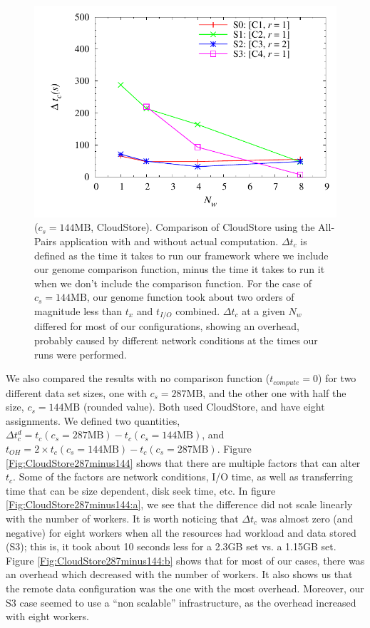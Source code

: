 \documentclass{rspublic}
\begin{document}
\begin{figure}
\begin{center}
\includegraphics[scale=0.5]{data/graphs/CloudStoreComputeMinusNoCompute144}
\caption{($c_s= \mbox{144MB}$, CloudStore). Comparison of CloudStore using the All-Pairs application with
and without actual computation. $\Delta t_c$ is defined as the time it
takes to run our framework where we include our genome comparison
function, minus the time it takes to run it when we don't include the
comparison function. For the case of $c_s=144\mbox{MB}$, our genome function
took about two orders of magnitude less than $t_x$ and $t_{I/O}$
combined. $\Delta t_c$ at a given $N_w$ differed for most of our
configurations, showing an overhead, probably caused by different
network conditions at the times our runs were performed.}
\label{Fig:experiment4}
\end{center}
\vspace{-0.5cm}
\end{figure}

We also compared the results with no comparison function
($t_{compute}=0$) for two different data set sizes, one with $c_s =
287\mbox{MB}$, and the other one with half the size, $c_s = 144\mbox{MB}$ (rounded
value). Both used CloudStore, and have eight assignments. We defined two
quantities, $\Delta t_c^d = t_c(c_s = 287\mbox{MB}) - t_c(c_s = 144\mbox{MB})$, and
$t_{OH} = 2 \times t_c(c_s = 144\mbox{MB}) - t_c(c_s = 287\mbox{MB})$. Figure
\ref{Fig:CloudStore287minus144} shows that there are multiple factors
that can alter $t_c$. Some of the factors are network conditions, I/O
time, as well as transferring time that can be size dependent, disk seek
time, etc. In figure \ref{Fig:CloudStore287minus144:a}, we see that the
difference did not scale linearly with the number of workers. It is
worth noticing that $\Delta t_c$ was almost zero (and negative) for
eight workers when all the resources had workload and data stored (S3);
this is, it took about 10 seconds less for a 2.3GB set vs. a 1.15GB
set. Figure \ref{Fig:CloudStore287minus144:b} shows that for most of our
cases, there was an overhead which decreased with the number of workers.
It also shows us that the remote data configuration was the one with the
most overhead. Moreover, our S3 case seemed to use a ``non scalable''
infrastructure, as the overhead increased with eight workers.
\end{document}
